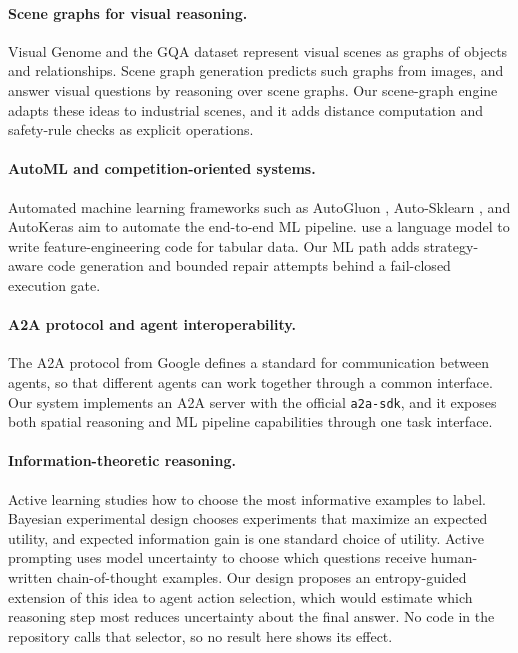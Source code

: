 \documentclass{article}
\begin{document}
\paragraph{Scene graphs for visual reasoning.}
Visual Genome \citep{krishna2017visual} and the GQA dataset \citep{hudson2019gqa} represent visual scenes as graphs of objects and relationships. Scene graph generation \citep{xu2017scenegraph} predicts such graphs from images, and \citet{hildebrandt2020scene} answer visual questions by reasoning over scene graphs. Our scene-graph engine adapts these ideas to industrial scenes, and it adds distance computation and safety-rule checks as explicit operations.

\paragraph{AutoML and competition-oriented systems.}
Automated machine learning frameworks such as AutoGluon \citep{erickson2020autogluon}, Auto-Sklearn \citep{feurer2019autosklearn}, and AutoKeras \citep{jin2023autokeras} aim to automate the end-to-end ML pipeline. \citet{hollmannCAAFE} use a language model to write feature-engineering code for tabular data. Our ML path adds strategy-aware code generation and bounded repair attempts behind a fail-closed execution gate.

\paragraph{A2A protocol and agent interoperability.}
The A2A protocol from Google \citep{google2024a2a} defines a standard for communication between agents, so that different agents can work together through a common interface. Our system implements an A2A server with the official \texttt{a2a-sdk}, and it exposes both spatial reasoning and ML pipeline capabilities through one task interface.

\paragraph{Information-theoretic reasoning.}
Active learning \citep{settles2009active} studies how to choose the most informative examples to label. Bayesian experimental design \citep{chaloner1995bayesian} chooses experiments that maximize an expected utility, and expected information gain is one standard choice of utility. Active prompting \citep{diaoActive} uses model uncertainty to choose which questions receive human-written chain-of-thought examples. Our design proposes an entropy-guided extension of this idea to agent action selection, which would estimate which reasoning step most reduces uncertainty about the final answer. No code in the repository calls that selector, so no result here shows its effect.
\end{document}

